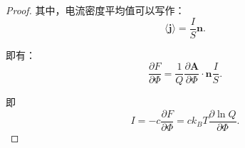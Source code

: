 \documentclass[reqno,a4paper,12pt]{amsart}
\begin{document}
\begin{proof}
其中，电流密度平均值可以写作：
\[
	\langle \mathbf{j} \rangle = \frac{I}{S} \mathbf{n}.
\]

即有：
\[
	\frac{\partial F}{\partial \Phi} = \frac{1}{Q} \frac{\partial \mathbf{A}}{\partial \Phi} \cdot \mathbf{n} \frac{I}{S}.
\]

即
\[
	I = -c\frac{\partial F}{\partial \Phi} = ck_BT \frac{\partial \ln Q}{\partial \Phi}.
\]

\end{proof}
\end{document}
